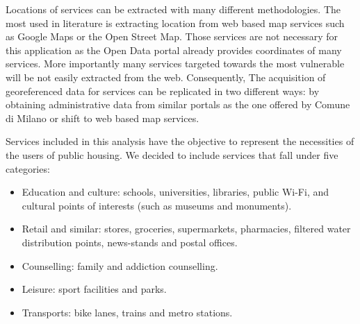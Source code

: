 \documentclass[11pt, titlepage]{article}
\begin{document}
Locations of services can be extracted with many different methodologies. The most used in literature is extracting location from web based map services such as Google Maps or the Open Street Map. Those services are not necessary for this application as the Open Data portal already provides coordinates of many services. More importantly many services targeted towards the most vulnerable will be not easily extracted from the web. Consequently, The acquisition of georeferenced data for services can be replicated in two different ways: by obtaining administrative data from similar portals as the one offered by Comune di Milano or shift to web based map services.

Services included in this analysis have the objective to represent the necessities of the users of public housing. We decided to include services that fall under five categories:
\begin{itemize}
	\item Education and culture: schools, universities, libraries, public Wi-Fi, and cultural points of interests (such as museums and monuments).
	\item  Retail and similar: stores, groceries, supermarkets, pharmacies, filtered water distribution points, news-stands and postal offices. 
	\item Counselling: family and addiction counselling.
	\item Leisure: sport facilities and parks.
	\item Transports: bike lanes, trains and metro stations.
\end{itemize}
\end{document}
